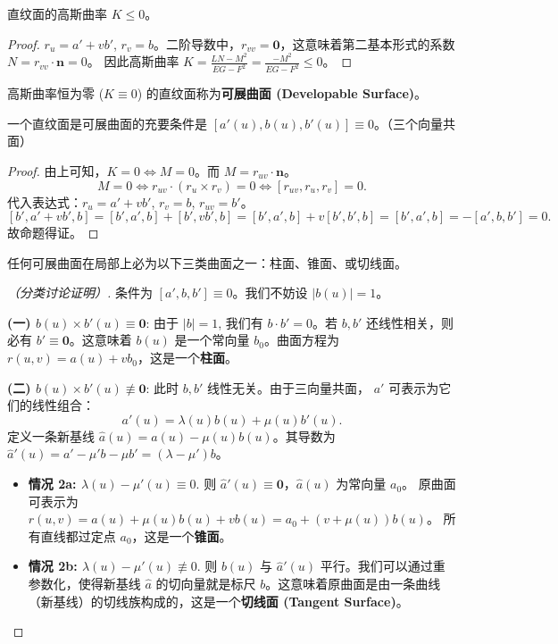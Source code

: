 \documentclass[lang=cn,10pt,thmcnt=section]{elegantbook}
\renewcommand{\vec}[1]{\mathbf{#1}}
\begin{document}
\begin{proposition}
    直纹面的高斯曲率 $K \leq 0$。
\end{proposition}
\begin{proof}
    $r_u = a' + v b'$, $r_v = b$。二阶导数中，$r_{vv} = \vec{0}$，这意味着第二基本形式的系数 $N = r_{vv} \cdot \vec{n} = 0$。
    因此高斯曲率 $K = \frac{LN - M^2}{EG - F^2} = \frac{-M^2}{EG - F^2} \leq 0$。
\end{proof}

\begin{definition}[可展曲面]
    高斯曲率恒为零 ($K \equiv 0$) 的直纹面称为\textbf{可展曲面 (Developable Surface)}。
\end{definition}

\begin{proposition}
    一个直纹面是可展曲面的充要条件是 $[a'(u), b(u), b'(u)] \equiv 0$。（三个向量共面）
\end{proposition}
\begin{proof}
    由上可知，$K=0 \iff M=0$。而 $M = r_{uv} \cdot \vec{n}$。
    \[
    M=0 \iff r_{uv} \cdot (r_u \times r_v) = 0 \iff [r_{uv}, r_u, r_v] = 0.
    \]
    代入表达式：$r_u=a'+vb'$, $r_v=b$, $r_{uv}=b'$。
    \[
    [b', a'+vb', b] = [b', a', b] + [b', vb', b] = [b', a', b] + v[b',b',b] = [b', a', b] = -[a', b, b'] = 0.
    \]
    故命题得证。
\end{proof}

\begin{theorem}[可展曲面的分类]
    任何可展曲面在局部上必为以下三类曲面之一：柱面、锥面、或切线面。
\end{theorem}
\begin{proof}[（分类讨论证明）]
    条件为 $[a', b, b'] \equiv 0$。我们不妨设 $|b(u)|=1$。
    
    \textbf{(一) $b(u) \times b'(u) \equiv \vec{0}$}: 由于 $|b|=1$, 我们有 $b \cdot b' = 0$。若 $b, b'$ 还线性相关，则必有 $b' \equiv \vec{0}$。这意味着 $b(u)$ 是一个常向量 $b_0$。曲面方程为 $r(u,v) = a(u) + v b_0$，这是一个\textbf{柱面}。
    
    \textbf{(二) $b(u) \times b'(u) \not\equiv \vec{0}$}: 此时 $b, b'$ 线性无关。由于三向量共面， $a'$ 可表示为它们的线性组合：
    \[ a'(u) = \lambda(u) b(u) + \mu(u) b'(u). \]
    定义一条新基线 $\hat{a}(u) = a(u) - \mu(u) b(u)$。其导数为 $\hat{a}'(u) = a' - \mu' b - \mu b' = (\lambda - \mu')b$。
    
    \begin{itemize}
        \item \textbf{情况 2a: $\lambda(u) - \mu'(u) \equiv 0$}. 则 $\hat{a}'(u) \equiv \vec{0}$，$\hat{a}(u)$ 为常向量 $a_0$。
        原曲面可表示为 $r(u,v) = \hat{a}(u) + \mu(u)b(u) + v b(u) = a_0 + (v+\mu(u))b(u)$。
        所有直线都过定点 $a_0$，这是一个\textbf{锥面}。
        
        \item \textbf{情况 2b: $\lambda(u) - \mu'(u) \not\equiv 0$}. 则 $b(u)$ 与 $\hat{a}'(u)$ 平行。我们可以通过重参数化，使得新基线 $\hat{a}$ 的切向量就是标尺 $b$。这意味着原曲面是由一条曲线（新基线）的切线族构成的，这是一个\textbf{切线面 (Tangent Surface)}。
    \end{itemize}
\end{proof}
\end{document}
